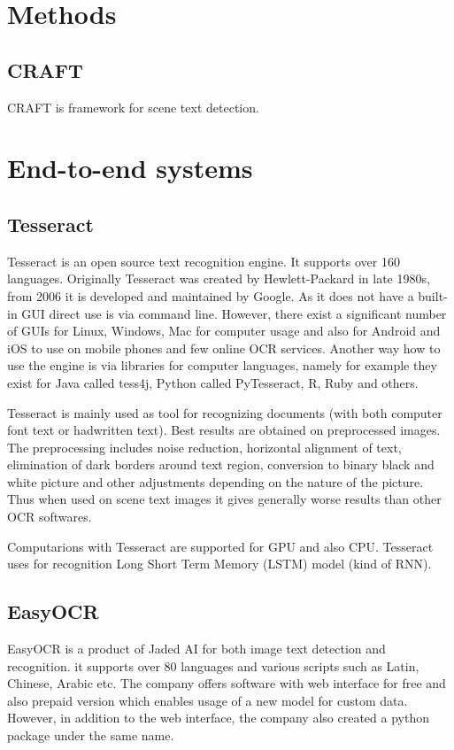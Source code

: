 \section*{Methods}
\subsection{CRAFT}

CRAFT is framework for scene text detection.

\section{End-to-end systems}

\subsection{Tesseract}

Tesseract is an open source text recognition engine. It supports over 160 languages. Originally Tesseract was created by Hewlett-Packard in late 1980s, from 2006 it is developed and maintained by Google. As it does not have a built-in GUI direct use is via command line. However, there exist a significant number of GUIs for Linux, Windows, Mac for computer usage and also for Android and iOS to use on mobile phones and few online OCR services. Another way how to use the engine is via libraries for computer languages, namely for example they exist for Java called tess4j, Python called PyTesseract, R, Ruby and others. \cite{tesseract1}

Tesseract is mainly used as tool for recognizing documents (with both computer font text or hadwritten text). Best results are obtained on preprocessed images. The preprocessing includes noise reduction, horizontal alignment of text, elimination of dark borders around text region, conversion to binary black and white picture and other adjustments depending on the nature of the picture. Thus when used on scene text images it gives generally worse results than other OCR softwares. 

Computarions with Tesseract are supported for GPU and also CPU. Tesseract uses for recognition Long Short Term Memory (LSTM) model (kind of RNN).

\subsection{EasyOCR}

EasyOCR is a product of Jaded AI for both image text detection and recognition. it supports over 80 languages and various scripts such as Latin, Chinese, Arabic etc. The company offers software with web interface for free and also prepaid version which enables usage of a new model for custom data. However, in addition to the web interface, the company also created a python package under the same name.\cite{easyocr1}

